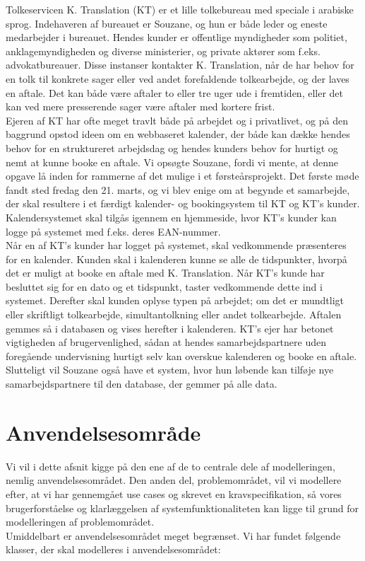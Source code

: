 \documentclass[12pt]{article}   %
\begin{document}
Tolkeservicen K. Translation (KT) er et lille tolkebureau med speciale i arabiske 
sprog. Indehaveren af bureauet er Souzane, og hun er både leder og eneste
medarbejder i bureauet. Hendes kunder er offentlige myndigheder som
politiet, anklagemyndigheden og diverse ministerier, og private aktører som f.eks. advokatbureauer. Disse instanser kontakter K. Translation, når de har
behov for en tolk til konkrete sager eller ved andet forefaldende
tolkearbejde, og der laves en aftale. Det kan både være aftaler to eller tre uger 
ude i fremtiden, eller det kan ved mere presserende sager være aftaler med
kortere frist.\\
Ejeren af KT har ofte meget travlt både på arbejdet og i privatlivet, og på
den baggrund opstod ideen om en webbaseret kalender, der både kan dække hendes behov for en struktureret arbejdsdag og hendes kunders behov for hurtigt og nemt at kunne booke en aftale. Vi opsøgte Souzane, fordi vi mente, at denne opgave lå inden for
rammerne af det mulige i et førsteårsprojekt. Det første møde fandt 
sted fredag den 21. marts, og vi blev enige om at begynde et samarbejde, der
skal resultere i et færdigt kalender- og bookingsystem til KT og KT's kunder.
Kalendersystemet skal tilgås igennem en hjemmeside, hvor KT's kunder
kan logge på systemet med f.eks. deres EAN-nummer. \\
Når en af KT's kunder har logget på systemet, skal vedkommende præsenteres for en
kalender. Kunden skal i kalenderen kunne se alle de tidspunkter,
hvorpå det er muligt at booke en
aftale med K. Translation. Når KT's kunde har besluttet sig for en dato og et tidspunkt,
taster vedkommende dette ind i systemet. Derefter skal kunden oplyse typen på
arbejdet; om det er mundtligt eller skriftligt tolkearbejde, simultantolkning
eller andet tolkearbejde. Aftalen gemmes så i databasen og
vises herefter i kalenderen. KT's ejer har betonet vigtigheden af
brugervenlighed, sådan at hendes samarbejdspartnere uden foregående undervisning 
hurtigt selv kan overskue kalenderen og booke en aftale. Slutteligt vil Souzane også have et system, hvor hun løbende kan tilføje nye samarbejdspartnere til den database, der gemmer på alle data. \\

\section{Anvendelsesområde}
Vi vil i dette afsnit kigge på den ene af de to centrale dele af modelleringen, nemlig anvendelsesområdet. Den anden del, problemområdet, vil vi modellere efter, at vi har gennemgået use cases og skrevet en kravspecifikation, så vores brugerforståelse og klarlæggelsen af systemfunktionaliteten kan ligge til grund for modelleringen af problemområdet. \\ 
Umiddelbart er anvendelsesområdet meget begrænset. Vi har fundet følgende klasser, der skal modelleres i anvendelsesområdet:
\end{document}
